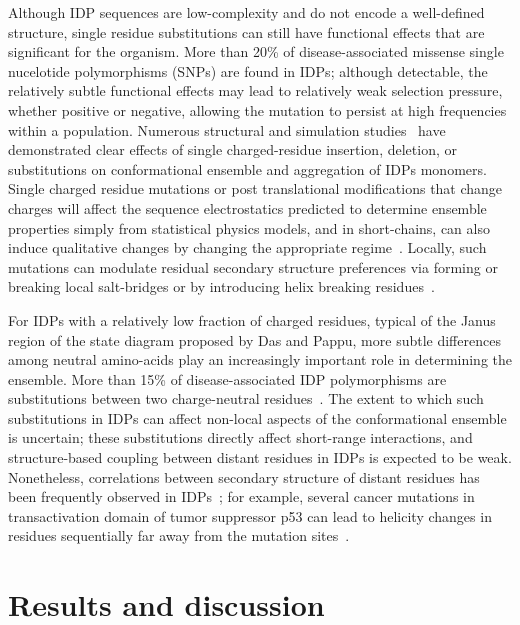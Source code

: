 \documentclass[10pt,letterpaper]{article}
\begin{document}
Although IDP sequences are low-complexity and do not encode a well-defined structure, single residue substitutions can still have functional effects that are significant for the organism. More than 20\% of disease-associated missense single nucelotide polymorphisms (SNPs) are found in IDPs\cite{Vacic2012a}; although detectable, the relatively subtle functional effects may lead to relatively weak selection pressure, whether positive or negative, allowing the mutation to persist at high frequencies within a population. Numerous structural and simulation studies~\cite{Larini2013b,Ganguly2015,Viet2014a,Viet2013,Truong2014a,Zhan2013a,Xu2013a} have demonstrated clear effects of single charged-residue insertion, deletion, or substitutions on conformational ensemble and aggregation of IDPs monomers. Single charged residue mutations or post translational modifications that change charges will affect the sequence electrostatics predicted to determine ensemble properties simply from statistical physics models, and in short-chains, can also induce qualitative changes by changing the appropriate regime~\cite{Das2015,Larini2013b,Bah2016,He2015}. Locally, such mutations can modulate residual secondary structure preferences via forming or breaking local salt-bridges or by introducing helix breaking residues~\cite{AlexanderConicella2016,Ganguly2015,Zhan2013a}. 

For IDPs with a relatively low fraction of charged residues, typical of the Janus region of the state diagram proposed by Das and Pappu\cite{Das2015,Das2013a}, more subtle differences among neutral amino-acids play an increasingly important role in determining the ensemble. More than 15\% of disease-associated IDP polymorphisms are substitutions between two charge-neutral residues~\cite{Vacic2012a}. The extent to which such substitutions in IDPs can affect non-local aspects of the conformational ensemble is uncertain; these substitutions directly affect short-range interactions, and structure-based coupling between distant residues in IDPs is expected to be weak. Nonetheless, correlations between secondary structure of distant residues has been frequently observed in IDPs~\cite{Ganguly2015,Iesmantavicius2013}; for example, several cancer mutations in transactivation domain of tumor suppressor p53 can lead to helicity changes in residues sequentially far away from the mutation sites~\cite{Ganguly2015}.

\section{Results and discussion}
\end{document}
